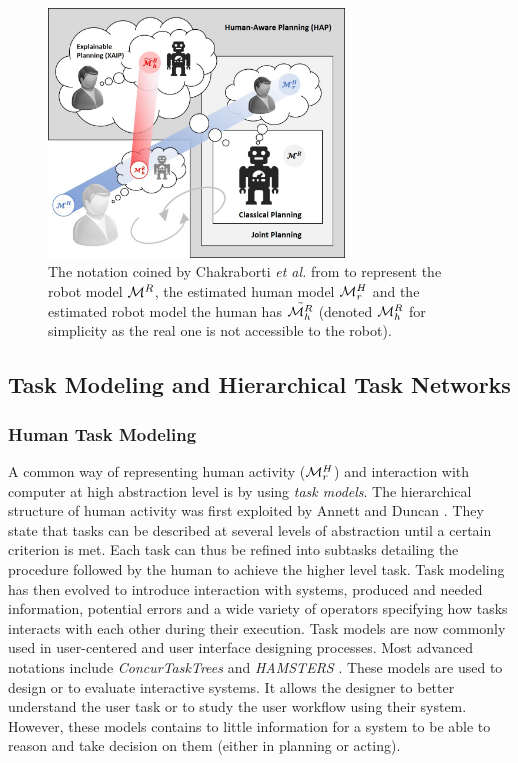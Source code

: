 \documentclass[a4paper,11pt,twoside]{StyleThese}
\begin{document}
\begin{figure}
\centering
\includegraphics[width=0.7\textwidth]{figures/chapter1/chkraborti3models.png}
\caption{The notation coined by Chakraborti \textit{et al.} from \cite{chakraborti2018human} to represent the robot model $\mathcal{M}^R$, the estimated human model $\mathcal{M}^H_r$ and the estimated robot model the human has $\tilde{\mathcal{M}^R_h}$ (denoted $\mathcal{M}^R_h$ for simplicity as the real one is not accessible to the robot).}
\label{fig:chakraborti3models}
\end{figure}

\subsection{Task Modeling and Hierarchical Task Networks}
\subsubsection{Human Task Modeling}
A common way of representing human activity ($\mathcal{M}^H_r$) and interaction with computer at high abstraction level is by using \textit{task models}. The hierarchical structure of human activity was first exploited by Annett and Duncan \cite{annett1967task}. They state that tasks can be described at several levels of abstraction until a certain criterion is met. Each task can thus be refined into subtasks detailing the procedure followed by the human to achieve the higher level task.
Task modeling has then evolved to introduce interaction with systems, produced and needed information, potential errors and a wide variety of operators specifying how tasks interacts with each other during their execution. Task models are now commonly used in user-centered and user interface designing processes. Most advanced notations include \textit{ConcurTaskTrees} \cite{paterno2004concurtasktrees} and \textit{HAMSTERS} \cite{martinie2019analysing}.
These models are used to design or to evaluate interactive systems. It allows the designer to better understand the user task or to study the user workflow using their system. However, these models contains to little information for a system to be able to reason and take decision on them (either in planning or acting).
\end{document}
